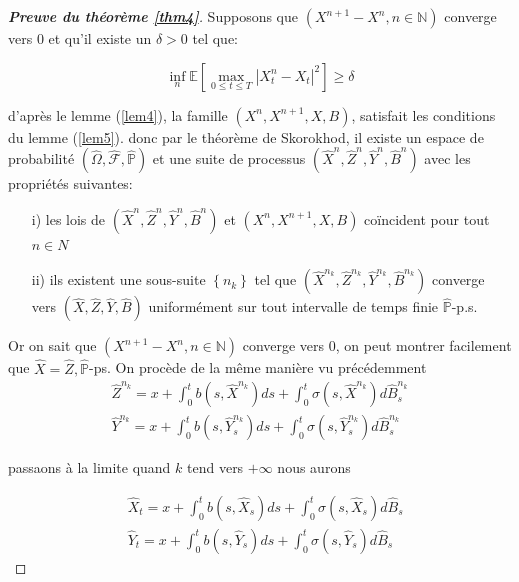 \documentclass[A4paper,12pt]{report}
\newcommand{\N}{{\mathbb{N}}}
\newcommand{\E}{{\mathbb{E}}}
\newcommand{\pr}{{\mathbb{P}}}
\begin{document}
\begin{proof}[\textbf{Preuve du théorème \ref{thm4}}]
Supposons que $(X^{n+1}-X^{n}, n \in \N)$ converge vers 0 et qu'il existe un $\delta>0$ tel que:

$$
\inf _{n} \E\left[\max _{0 \leq t \leq T}\left|X_{t}^{n}-X_{t}\right|^{2}\right] \geq \delta
$$

d'après le lemme (\ref{lem4}), la famille $\left(X^{n}, X^{n+1}, X, B\right)$, satisfait les  conditions du lemme (\ref{lem5}). donc par le théorème de Skorokhod, il existe un espace de probabilité  $(\widehat{\Omega}, \widehat{\mathcal{F}}, \widehat{\pr})$ et une suite de processus $\left(\widehat{X}^{n}, \widehat{Z}^{n}, \widehat{Y}^{n}, \widehat{B}^{n}\right)$ avec les  propriétés suivantes:
\begin{itemize}
\item[i)] les lois de $\left(\widehat{X}^{n}, \widehat{Z}^{n}, \widehat{Y}^{n}, \widehat{B}^{n}\right)$ et $\left(X^{n}, X^{n+1}, X, B\right)$ coïncident pour tout $n \in N$
\item[ii)] ils existent une sous-suite $\left\{n_{k}\right\}$ tel que $\left(\widehat{X}^{n_{k}}, \widehat{Z}^{n_{k}}, \widehat{Y}^{n_{k}}, \widehat{B}^{n_{k}}\right)$ converge vers $(\widehat{X}, \widehat{Z}, \widehat{Y}, \widehat{B})$ uniformément sur tout intervalle de temps finie $\widehat{\pr}$-p.s.
\end{itemize} 

Or on sait que $(X^{n+1}-X^{n}, n\in \N)$ converge vers 0, on peut montrer facilement que $\widehat{X}=\widehat{Z}, \widehat{\pr}$-ps.
On procède de la même manière vu précédemment
$$
\begin{aligned}
 \widehat{Z}^{n_{k}}=x+\int_{0}^{t} b\left(s, \widehat{X}^{n_{k}}\right) d s + \int_{0}^{t} \sigma\left(s, \widehat{X}^{n_{k}}\right) d \widehat{B}_{s}^{n_{k}} \\
 \widehat{Y}^{n_{k}}=x +\int_{0}^{t} b\left(s, \widehat{Y}_{s}^{n_{k}}\right) d s + \int_{0}^{t} \sigma\left(s, \widehat{Y}_{s}^{n_{k}}\right) d \widehat{B}_{s}^{n_{k}}
\end{aligned}
$$

passaons à la limite quand $k$ tend vers $+\infty$ nous aurons

$$
\begin{aligned}
& \widehat{X}_{t}=x+\int_{0}^{t} b\left(s, \widehat{X}_{s}\right) d s +\int_{0}^{t} \sigma\left(s, \widehat{X}_{s}\right) d \widehat{B}_{s}\\
& \widehat{Y}_{t}=x+\int_{0}^{t} b\left(s, \widehat{Y}_{s}\right) d s +\int_{0}^{t} \sigma\left(s, \widehat{Y}_{s}\right) d \widehat{B}_{s}
\end{aligned}
$$


\end{proof}
\end{document}
